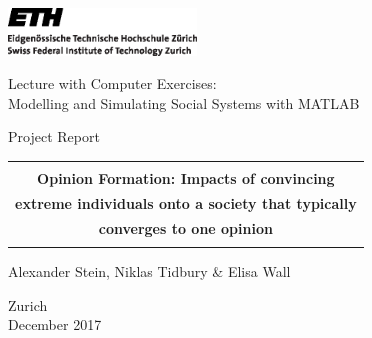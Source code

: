 
\thispagestyle{empty}

\begin{center}
\includegraphics[width=5cm]{ETHlogo.eps}

\bigskip


\bigskip


\bigskip


\LARGE{ 	Lecture with Computer Exercises:\\ }
\LARGE{ Modelling and Simulating Social Systems with MATLAB\\}

\bigskip

\bigskip

\small{Project Report}\\

\bigskip

\bigskip

\bigskip

\bigskip


\begin{tabular}{|c|}
\hline
\\
\textbf{\LARGE{Opinion Formation: Impacts of convincing}}\\
\textbf{\LARGE{extreme individuals onto a society that typically}}\\
\textbf{\LARGE{converges to one opinion}}\\
\\
\hline
\end{tabular}
\bigskip

\bigskip

\bigskip

\LARGE{Alexander Stein, Niklas Tidbury \& Elisa Wall}



\bigskip

\bigskip

\bigskip

\bigskip

\bigskip

\bigskip

\bigskip

\bigskip

Zurich\\
December 2017\\

\end{center}


